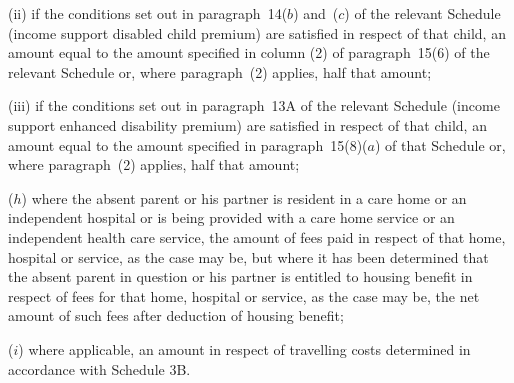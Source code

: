 \documentclass[12pt,a4paper]{article}
\begin{document}
\begin{enumerate}
\begin{enumerate}
(ii) if the conditions set out in paragraph~14($b$) and~($c$) of the relevant Schedule (income support disabled child premium) are satisfied in respect of that child, an amount equal to the amount specified in column (2) of paragraph~15(6) of the relevant Schedule or, where paragraph~(2) applies, half that amount;

(iii) if the conditions set out in paragraph~13A of the relevant Schedule (income support enhanced disability premium) are satisfied in respect of that child, an amount equal to the amount specified in paragraph~15(8)($a$)  of that Schedule or, where paragraph~(2) applies, half that amount;
\end{enumerate}

%
%

($h$) where the absent parent or his partner is resident in a care home or an independent hospital or is being provided with a care home service or an independent health care service, the amount of fees paid in respect of that home, hospital or service, as the case may be, but where it has been determined that the absent parent in question or his partner is entitled to housing benefit in respect of fees for that home, hospital or service, as the case may be, the net amount of such fees after deduction of housing benefit;

($i$) where applicable, an amount in respect of travelling costs determined in accordance with Schedule 3B.
\end{enumerate}
\end{document}
